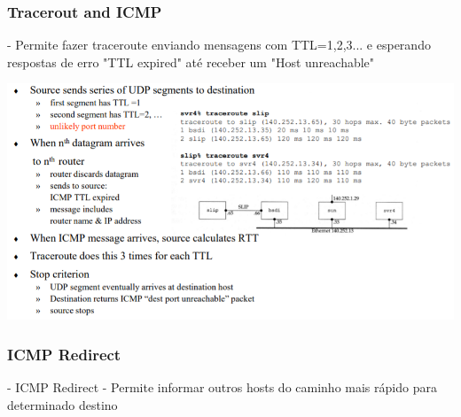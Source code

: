 \documentclass{article}
\begin{document}
\subsubsection{Tracerout and ICMP}
- Permite fazer traceroute enviando mensagens com TTL=1,2,3... e esperando respostas de erro	"TTL expired" até receber um "Host unreachable"
\begin{center}
    \includegraphics[width=14cm]{images/RCOM31.png}
\end{center}

\subsubsection{ICMP Redirect}
- ICMP Redirect - Permite informar outros hosts do caminho mais rápido para determinado destino
\end{document}
